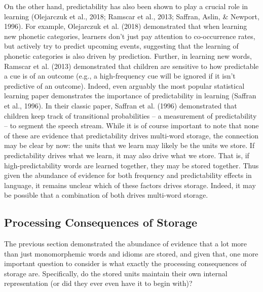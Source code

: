 \documentclass[
  man,floatsintext]{apa6}
\begin{document}
On the other hand, predictability has also been shown to play a crucial role in learning (Olejarczuk et al., 2018; Ramscar et al., 2013; Saffran, Aslin, \& Newport, 1996). For example, Olejarczuk et al. (2018) demonstrated that when learning new phonetic categories, learners don't just pay attention to co-occurrence rates, but actively try to predict upcoming events, suggesting that the learning of phonetic categories is also driven by prediction. Further, in learning new words, Ramscar et al. (2013) demonstrated that children are sensitive to how predictable a cue is of an outcome (e.g., a high-frequency cue will be ignored if it isn't predictive of an outcome). Indeed, even arguably the most popular statistical learning paper demonstrates the importance of predictability in learning (Saffran et al., 1996). In their classic paper, Saffran et al. (1996) demonstrated that children keep track of transitional probabilities -- a measurement of predictability -- to segment the speech stream. While it is of course important to note that none of these are evidence that predictability drives multi-word storage, the connection may be clear by now: the units that we learn may likely be the units we store. If predictability drives what we learn, it may also drive what we store. That is, if high-predictability words are learned together, they may be stored together. Thus given the abundance of evidence for both frequency and predictability effects in language, it remains unclear which of these factors drives storage. Indeed, it may be possible that a combination of both drives multi-word storage.

\hypertarget{processing-consequences-of-storage}{%
\subsection{Processing Consequences of Storage}\label{processing-consequences-of-storage}}

The previous section demonstrated the abundance of evidence that a lot more than just monomorphemic words and idioms are stored, and given that, one more important question to consider is what exactly the processing consequences of storage are. Specifically, do the stored units maintain their own internal representation (or did they ever even have it to begin with)?
\end{document}
